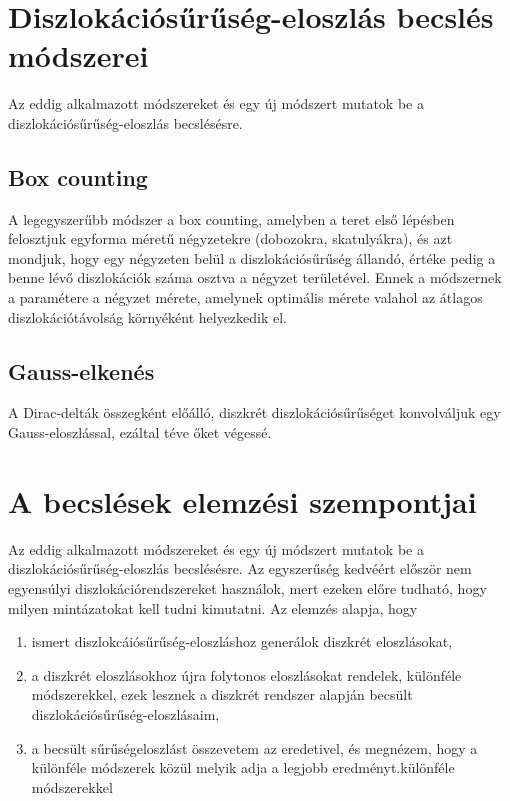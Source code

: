 \documentclass[10pt,a4paper]{scrartcl}
\begin{document}
\section{Diszlokációsűrűség-eloszlás becslés módszerei}
Az eddig alkalmazott módszereket és egy új módszert mutatok be a diszlokációsűrűség-eloszlás becslésésre.

\subsection{Box counting}
A legegyszerűbb módszer a box counting, amelyben a teret első lépésben felosztjuk egyforma méretű négyzetekre (dobozokra, skatulyákra), és azt mondjuk, hogy egy négyzeten belül a diszlokációsűrűség állandó, értéke pedig a benne lévő diszlokációk száma osztva a négyzet területével. Ennek a módszernek a paramétere a négyzet mérete, amelynek optimális mérete valahol az átlagos diszlokációtávolság környéként helyezkedik el.

\subsection{Gauss-elkenés}
A Dirac-delták összegként előálló, diszkrét diszlokációsűrűséget konvolváljuk egy Gauss-eloszlással, ezáltal téve őket végessé. 

\section{A becslések elemzési szempontjai}
Az eddig alkalmazott módszereket és egy új módszert mutatok be a diszlokációsűrűség-eloszlás becslésésre. Az egyszerűség kedvéért először nem egyensúlyi diszlokációrendszereket használok, mert ezeken előre tudható, hogy milyen mintázatokat kell tudni kimutatni. Az elemzés alapja, hogy
\begin{enumerate}
    \item ismert diszlokcáiósűrűség-eloszláshoz generálok diszkrét eloszlásokat,
    \item a diszkrét eloszlásokhoz újra folytonos eloszlásokat rendelek, különféle módszerekkel, ezek lesznek a diszkrét rendszer alapján becsült diszlokációsűrűség-eloszlásaim,
    \item a becsült sűrűségeloszlást összevetem az eredetivel, és megnézem, hogy a különféle módszerek közül melyik adja a legjobb eredményt.különféle módszerekkel
\end{enumerate}
\end{document}
